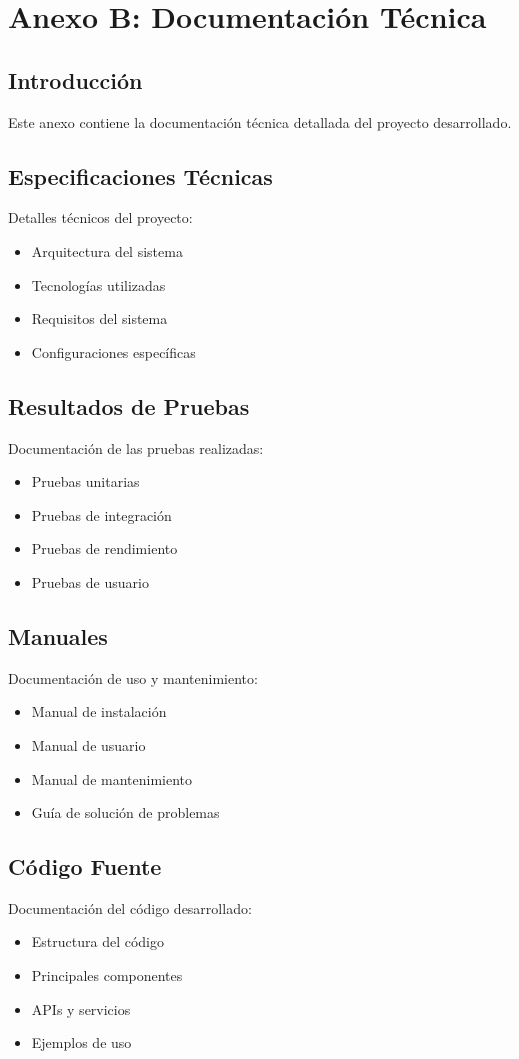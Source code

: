 \chapter{Anexo B: Documentación Técnica}

\section{Introducción}
Este anexo contiene la documentación técnica detallada del proyecto desarrollado.

\section{Especificaciones Técnicas}
Detalles técnicos del proyecto:
\begin{itemize}
    \item Arquitectura del sistema
    \item Tecnologías utilizadas
    \item Requisitos del sistema
    \item Configuraciones específicas
\end{itemize}

\section{Resultados de Pruebas}
Documentación de las pruebas realizadas:
\begin{itemize}
    \item Pruebas unitarias
    \item Pruebas de integración
    \item Pruebas de rendimiento
    \item Pruebas de usuario
\end{itemize}

\section{Manuales}
Documentación de uso y mantenimiento:
\begin{itemize}
    \item Manual de instalación
    \item Manual de usuario
    \item Manual de mantenimiento
    \item Guía de solución de problemas
\end{itemize}

\section{Código Fuente}
Documentación del código desarrollado:
\begin{itemize}
    \item Estructura del código
    \item Principales componentes
    \item APIs y servicios
    \item Ejemplos de uso
\end{itemize}